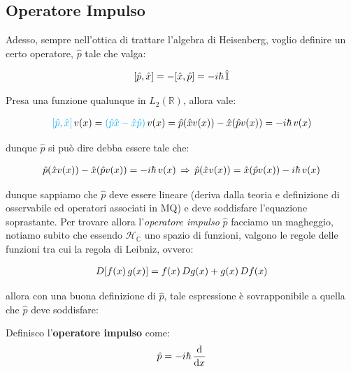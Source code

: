\subsection{Operatore Impulso}

	Adesso, sempre nell'ottica di trattare l'algebra di Heisenberg, voglio definire un certo operatore, $\hat{p}$ tale che valga:
	
\begin{align*}
	\qty[\hat{p}, \hat{x}] = - \qty[\hat{x}, \hat{p}] = - i\hbar \, \hat{\mathbb{I}}
\end{align*}

	Presa una funzione qualunque in $L_2(\mathbb{R})$, allora vale:
	
\begin{align*}
	\textcolor{cyan}{\qty[\hat{p}, \hat{x}]} \, v(x) =\textcolor{cyan}{ \qty(\hat{p}\hat{x} - \hat{x}\hat{p}) } \,  v(x) = \hat{p}\qty(\hat{x}v(x)) - \hat{x}\qty(\hat{p}v(x)) = -i \hbar \, v(x)
\end{align*}

	dunque $\hat{p}$ si può dire debba essere tale che:
	
\begin{align*}
	\hat{p}\qty(\hat{x}v(x)) - \hat{x}\qty(\hat{p}v(x)) = -i \hbar \, v(x) \, \Rightarrow \, \hat{p}\qty(\hat{x}v(x)) =  \hat{x}\qty(\hat{p}v(x)) - i \hbar \, v(x)
\end{align*}
	
	dunque sappiamo che $\hat{p}$ deve essere lineare (deriva dalla teoria e definizione di osservabile ed operatori associati in MQ) e deve soddisfare l'equazione soprastante. Per trovare allora l'\textit{operatore impulso} $\hat{p}$ facciamo un magheggio, notiamo subito che essendo $\mathcal{H}_{\mathbb{C}}$ uno spazio di funzioni, valgono le regole delle funzioni tra cui la regola di Leibniz, ovvero:

\begin{align*}
	D\qty[f(x)\,g(x)] = f(x) \, Dg(x) + g(x) \,Df(x) 
\end{align*}

	allora con una buona definizione di $\hat{p}$, tale espressione è sovrapponibile a quella che $\hat{p}$ deve soddisfare:
	
\begin{mydef}
	Definisco l'\textbf{operatore impulso} come:
\begin{align*}
	\hat{p} = -i\hbar \, \dv{x}
\end{align*}
\end{mydef}

